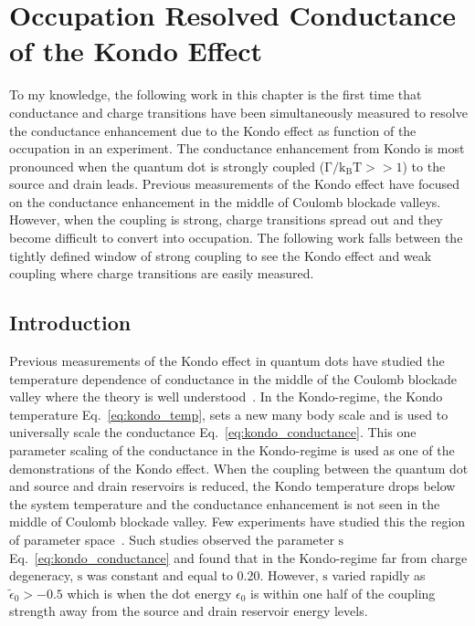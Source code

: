 \chapter[Occupation Resolved Conductance of the Kondo Effect]{Occupation Resolved Conductance of the Kondo Effect}\label{cha:mixed_valence_conductance}


To my knowledge, the following work in this chapter is the first time that conductance and charge transitions have been simultaneously measured to resolve the conductance enhancement due to the Kondo effect as function of the occupation in an experiment. The conductance enhancement from Kondo is most pronounced when the quantum dot is strongly coupled ($\mathrm{\Gamma/k_BT}>>1$) to the source and drain leads. Previous measurements of the Kondo effect have focused on the conductance enhancement in the middle of Coulomb blockade valleys. However, when the coupling is strong, charge transitions spread out and they become difficult to convert into occupation. The following work falls between the tightly defined window of strong coupling to see the Kondo effect and weak coupling where charge transitions are easily measured. 

\section{Introduction}
Previous measurements of the Kondo effect in quantum dots have studied the temperature dependence of conductance in the middle of the Coulomb blockade valley where the theory is well understood~\cite{kondo_unitary, costi_kondo_mv_eo_regime}. In the Kondo-regime, the Kondo temperature Eq.~\ref{eq:kondo_temp}, sets a new many body scale and is used to universally scale the conductance Eq.~\ref{eq:kondo_conductance}. This one parameter scaling of the conductance in the Kondo-regime is used as one of the demonstrations of the Kondo effect. When the coupling between the quantum dot and source and drain reservoirs is reduced, the Kondo temperature drops below the system temperature and the conductance enhancement is not seen in the middle of Coulomb blockade valley. Few experiments have studied this the region of parameter space~\cite{goldhaber_mv}. Such studies observed the parameter $\mathrm{s}$ Eq.~\ref{eq:kondo_conductance} and found that in the Kondo-regime far from charge degeneracy, $\mathrm{s}$ was constant and equal to $0.20$. However, $\mathrm{s}$ varied rapidly as $\tilde{\epsilon}_0>-0.5$ which is when the dot energy $\epsilon_0$ is within one half of the coupling strength away from the source and drain reservoir energy levels.  

